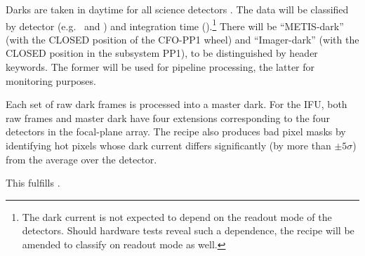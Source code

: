 Darks are taken in daytime for all science detectors
\cite{METIS-calibration_plan}. The data will be classified by detector
(e.g.~ and ) and integration time
().\footnote{The dark current is not expected to depend on the readout mode of the detectors. Should hardware tests reveal such a dependence, the recipe will be amended to classify on readout mode as well.} There will be ``METIS-dark''
(with the CLOSED position of the CFO-PP1 wheel) and ``Imager-dark''
(with the CLOSED position in the subsystem PP1), to be distinguished
by header keywords.
The former will be used for pipeline processing, the  latter for monitoring purposes.

Each set of raw dark frames is processed into a master dark. For the
IFU, both raw frames and master dark have four extensions
corresponding to the four detectors in the focal-plane array. The
recipe also produces bad pixel masks by identifying hot pixels whose
dark current differs significantly (by more than $\pm 5\sigma$) from
the average over the detector.

This fulfills .

